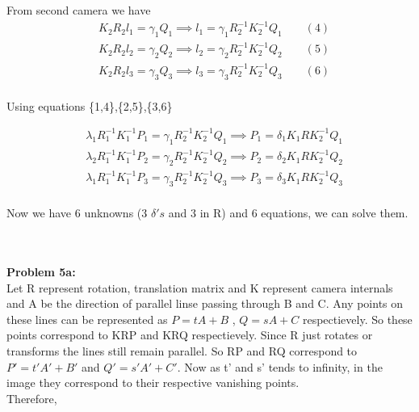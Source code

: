 \documentclass[a4paper]{article}
\begin{document}
From second camera we have 
\begin{equation*}
\begin{split}
& K_2R_2l_1 = \gamma_1 Q_1 \implies l_1 = \gamma_1^{}R_2^{-1}K_2^{-1}Q_1 \qquad (4)\\
& K_2R_2l_2 = \gamma_2 Q_2 \implies l_2 = \gamma_2^{}R_2^{-1}K_2^{-1}Q_2 \qquad (5)\\
& K_2R_2l_3 = \gamma_3 Q_3 \implies l_3 = \gamma_3^{}R_2^{-1}K_2^{-1}Q_3 \qquad (6)\\
\end{split}
\end{equation*}

Using equations \{1,4\},\{2,5\},\{3,6\}  

\begin{equation*}
\begin{split}
&\lambda_1^{}R_1^{-1}K_1^{-1}P_1 = \gamma_1^{}R_2^{-1}K_2^{-1}Q_1 \implies P_1 = \delta_1K_1RK_2^{-1}Q_1\\
&\lambda_2^{}R_1^{-1}K_1^{-1}P_2 = \gamma_2^{}R_2^{-1}K_2^{-1}Q_2 \implies P_2 = \delta_2K_1RK_2^{-1}Q_2\\
&\lambda_1^{}R_1^{-1}K_1^{-1}P_3 = \gamma_3^{}R_2^{-1}K_2^{-1}Q_3 \implies P_3 = \delta_3K_1RK_2^{-1}Q_3\\
\end{split}
\end{equation*}

Now we have 6 unknowns (3 $\delta 's$ and 3 in R) and 6 equations, we can solve them.

\hrulefill\\ \\



\textbf{Problem 5a:} \\
Let R represent rotation, translation matrix and K represent camera internals and A be the direction of parallel linse passing through B and C. Any points on these lines can be represented as $P=tA+B$ , $Q=sA+C$ respectievely. So these points correspond to KRP and KRQ respectievely. Since R just rotates or transforms the lines still remain parallel. So RP and RQ correspond to $P' = t'A'+B'$ and $Q'=s'A'+C'$. Now as t' and s' tends to infinity, in the image they correspond to their respective vanishing points.\\
Therefore, 
\end{document}
